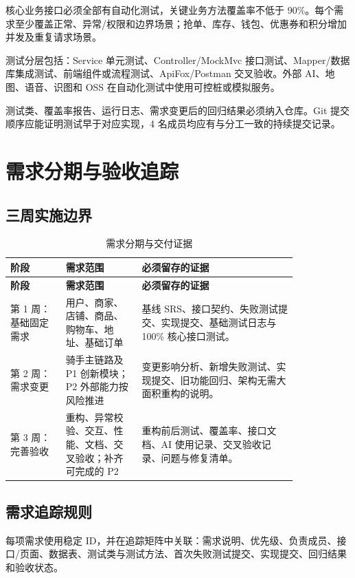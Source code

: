 核心业务接口必须全部有自动化测试，关键业务方法覆盖率不低于 90\%。每个需求至少覆盖正常、异常/权限和边界场景；抢单、库存、钱包、优惠券和积分增加并发及重复请求场景。

测试分层包括：Service 单元测试、Controller/MockMvc 接口测试、Mapper/数据库集成测试、前端组件或流程测试、ApiFox/Postman 交叉验收。外部 AI、地图、语音、识图和 OSS 在自动化测试中使用可控桩或模拟服务。

测试类、覆盖率报告、运行日志、需求变更后的回归结果必须纳入仓库。Git 提交顺序应能证明测试早于对应实现，4 名成员均应有与分工一致的持续提交记录。

\section{需求分期与验收追踪}

\subsection{三周实施边界}

\begin{longtable}{@{}p{0.16\linewidth}p{0.22\linewidth}p{0.45\linewidth}@{}}
\caption{需求分期与交付证据}\tabularnewline
\toprule
\textbf{阶段} & \textbf{需求范围} & \textbf{必须留存的证据} \\
\midrule
\endfirsthead
\toprule
\textbf{阶段} & \textbf{需求范围} & \textbf{必须留存的证据} \\
\midrule
\endhead
\bottomrule
\endfoot
第 1 周：基础固定需求 & 用户、商家、店铺、商品、购物车、地址、基础订单 & 基线 SRS、接口契约、失败测试提交、实现提交、基础测试日志与 100\% 核心接口测试。 \\
第 2 周：需求变更 & 骑手主链路及 P1 创新模块；P2 外部能力按风险推进 & 变更影响分析、新增失败测试、实现提交、旧功能回归、架构无需大面积重构的说明。 \\
第 3 周：完善验收 & 重构、异常校验、交互、性能、文档、交叉验收；补齐可完成的 P2 & 重构前后测试、覆盖率、接口文档、AI 使用记录、交叉验收记录、问题与修复清单。 \\
\end{longtable}

\subsection{需求追踪规则}

每项需求使用稳定 ID，并在追踪矩阵中关联：需求说明、优先级、负责成员、接口/页面、数据表、测试类与测试方法、首次失败测试提交、实现提交、回归结果和验收状态。

